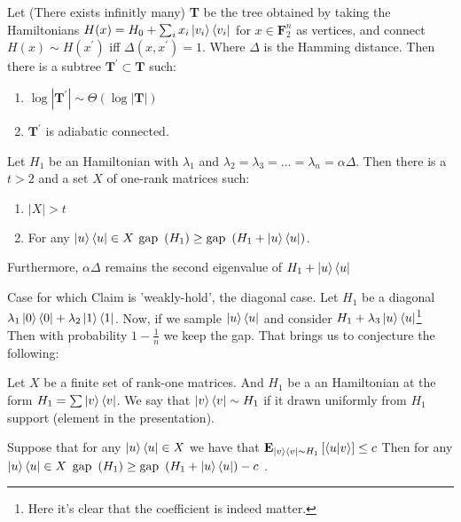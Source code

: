 \documentclass[manuscript,screen,review]{acmart}
\begin{document}
\begin{claim}
Let (There exists infinitly many) \textbf{T} be the tree obtained by taking the Hamiltonians $H(x) = H_{0} + \sum_{i}x_i\ket{v_i}\bra{v_i}$ for $x\in \mathbf{F}_2^n$ as vertices, and connect $H(x)\sim H(x^\prime)$ iff $\Delta(x,x^\prime)= 1$. Where $\Delta$ is the Hamming distance. Then there is a subtree $\textbf{T}^\prime \subset \textbf{T}$ such:  
\begin{enumerate}
    \item $\log|\textbf{T}^\prime| \sim \Theta(\log |\textbf{T}| ) $
    \item $\textbf{T}^\prime$ is adiabatic connected. 
\end{enumerate}
\end{claim}


\begin{claim}
\label{claim:claim1}
    Let $H_{1}$ be an Hamiltonian with $\lambda_{1}$ and $\lambda_2=\lambda_{3}=...=\lambda_{n}=\alpha\Delta$. Then there is a $t > 2$ and a set $X$ of one-rank matrices such: 
    \begin{enumerate}
    \item $|X| > t$
        \item For any $\ket{u}\bra{u} \in X$  $\text{gap } \left( H_{1} \right) \ge \text{gap } \left( H_{1} + \ket{u}\bra{u}  \right) $.  
    \end{enumerate}
    Furthermore, $\alpha \Delta$ remains the second eigenvalue of $H_{1} + \ket{u}\bra{u}$
\end{claim}

\newcommand{\kbra}[2]{\ket{#1}\bra{#2}}
\newcommand{\kbri}{\kbra{i^\prime}{i}}

Case for which Claim  is 'weakly-hold', the diagonal case. Let $H_{1}$ be a diagonal $\lambda_{1}\ket{0}\bra{0} + \lambda_{2}\ket{1}\bra{1}$. Now, if we sample $\ket{u}\bra{u}$ and consider $H_{1} + \lambda_{3}\ket{u}\bra{u}$\footnote{Here it's clear that the coefficient is indeed matter.} Then with probability $1 - \frac{1}{n}$ we keep the gap. That brings us to conjecture the following:

\begin{claim}
Let $X$ be a finite set of rank-one matrices. And $H_{1}$ be a
an Hamiltonian at the form $H_1 = \sum{ \ket{v}\bra{v}}$. We say that $\ket{v}\bra{v} \sim H_{1}$ if it drawn uniformly from $H_{1}$ support (element in the presentation).

Suppose that for any $\ket{u}\bra{u} \in X $ we have that $\textbf{E}_{\ket{v}\bra{v}\sim H_1}\left[  \braket{u|v}  \right] \le c$ Then for any $\ket{u}\bra{u} \in X$  $\text{gap } \left( H_{1} \right) \ge \text{gap } \left( H_{1} + \ket{u}\bra{u}  \right) - c$ .  
\end{claim}
\end{document}
